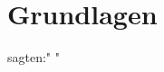\section{Grundlagen}
\label{sec:grundlagen}

\cite{king2006meta} sagten:" \blindtext" \parencite{behrenbruch2013understanding}